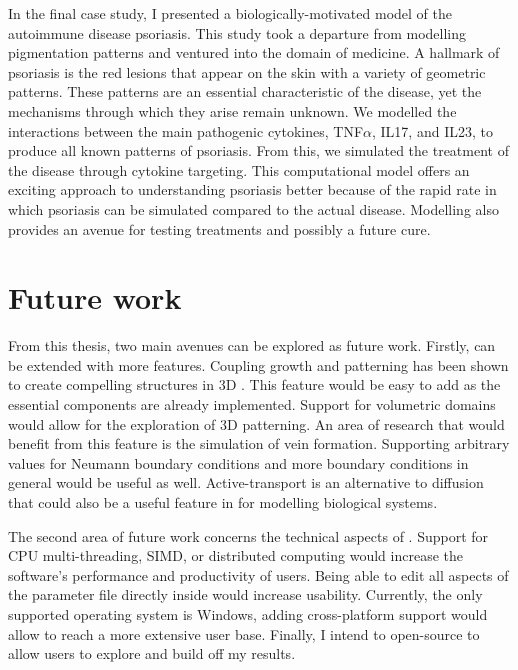 In the final case study, I presented a biologically-motivated model of the autoimmune disease psoriasis. This study took a departure from modelling pigmentation patterns and ventured into the domain of medicine. A hallmark of psoriasis is the red lesions that appear on the skin with a variety of geometric patterns. These patterns are an essential characteristic of the disease, yet the mechanisms through which they arise remain unknown. We modelled the interactions between the main pathogenic cytokines, TNF$\alpha$, IL17, and IL23, to produce all known patterns of psoriasis. From this, we simulated the treatment of the disease through cytokine targeting. This computational model offers an exciting approach to understanding psoriasis better because of the rapid rate in which psoriasis can be simulated compared to the actual disease. Modelling also provides an avenue for testing treatments and possibly a future cure.

\section{Future work}
From this thesis, two main avenues can be explored as future work. Firstly, \ProgramName{} can be extended with more features. Coupling growth and patterning has been shown to create compelling structures in 3D \cite{harrison2002, holloway2007}. This feature would be easy to add as the essential components are already implemented. Support for volumetric domains would allow for the exploration of 3D patterning. An area of research that would benefit from this feature is the simulation of vein formation. Supporting arbitrary values for Neumann boundary conditions and more boundary conditions in general would be useful as well. Active-transport is an alternative to diffusion that could also be a useful feature in \ProgramName{} for modelling biological systems. 

The second area of future work concerns the technical aspects of \ProgramName{}. Support for CPU multi-threading, SIMD, or distributed computing would increase the software's performance and productivity of users. Being able to edit all aspects of the parameter file directly inside \ProgramName{} would increase usability. Currently, the only supported operating system is Windows, adding cross-platform support would allow \ProgramName{} to reach a more extensive user base. Finally, I intend to open-source \ProgramName{} to allow users to explore and build off my results.